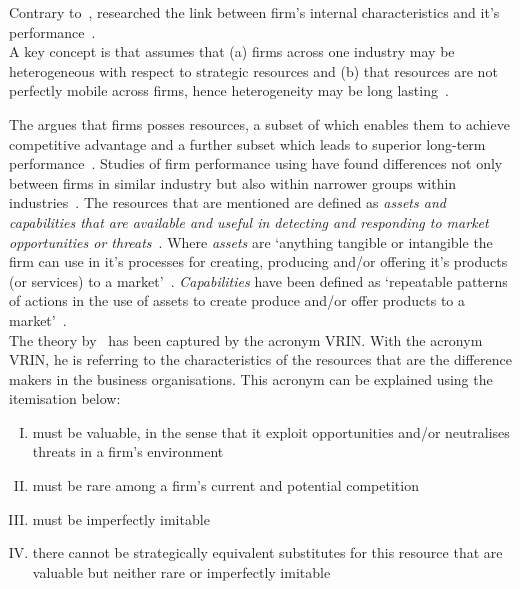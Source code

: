 Contrary to~\cite{Porter:1980to}, \rbt researched the link between firm's internal characteristics and it's performance~\citep{Barney:1991ur}.\\
A key concept is that \rbt assumes that (a) firms across one industry may be heterogeneous with respect to strategic resources and (b) that resources are not perfectly mobile across firms, hence heterogeneity may be long lasting~\citep{Barney:1991ur}.

The  argues that firms posses resources, a subset of which enables them to achieve competitive advantage and a further subset which leads to superior long-term performance~\citep{Barney:1991ur,Wernerfelt:1984hx,Grant:1991wg}.
Studies of firm performance using  have found differences not only between firms in similar industry but also within narrower groups within 
industries~\citep{Hansen:1989um,Cool:1988vw}.
The resources that are mentioned are defined as \textit{assets and capabilities that are available and useful in detecting and responding to market opportunities or threats}~\citep{sanchez:1996,Wade:2004wf}.
Where \textit{assets} are `anything tangible or intangible the firm can use in it's processes for creating, producing and/or offering it's products (or services) to a market'~\citep{sanchez:1996}.
\textit{Capabilities} have been defined as `repeatable patterns of actions in the use of assets to create produce and/or offer products to a market'~\citep{sanchez:1996}.\\
The theory by~\cite{Barney:1991ur} has been captured by the acronym VRIN\@.
With the acronym VRIN, he is referring to the characteristics of the resources that are the difference makers in the business organisations.
This acronym can be explained using the itemisation below:

\begin{enumerate}[(I)]
   \setlength{\itemsep}{1pt}
\item must be valuable, in the sense that it exploit opportunities and/or neutralises threats in a firm’s environment
\item must be rare among a firm’s current and potential competition 
\item must be imperfectly imitable
\item  there cannot be strategically equivalent substitutes for this resource that are valuable but neither rare or imperfectly imitable 
\end{enumerate} 

